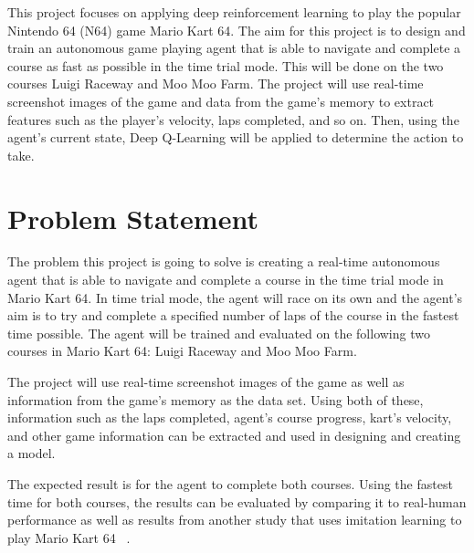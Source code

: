 \documentclass[10pt,twocolumn,letterpaper]{article}
\begin{document}
This project focuses on applying deep reinforcement learning to play the popular Nintendo 64 (N64) game Mario Kart 64. The aim for this project is to design and train an autonomous game playing agent that is able to navigate and complete a course as fast as possible in the time trial mode. This will be done on the two courses Luigi Raceway and Moo Moo Farm. The project will use real-time screenshot images of the game and data from the game's memory to extract features such as the player's velocity, laps completed, and so on. Then, using the agent's current state, Deep Q-Learning will be applied to determine the action to take.





\section{Problem Statement}
\label{sec:formatting}

The problem this project is going to solve is creating a real-time autonomous agent that is able to navigate and complete a course in the time trial mode in Mario Kart 64. In time trial mode, the agent will race on its own and the agent's aim is to try and complete a specified number of laps of the course in the fastest time possible. The agent will be trained and evaluated on the following two courses in Mario Kart 64: Luigi Raceway and Moo Moo Farm.

The project will use real-time screenshot images of the game as well as information from the game's memory as the data set. Using both of these, information such as the laps completed, agent's course progress, kart's velocity, and other game information can be extracted and used in designing and creating a model.

The expected result is for the agent to complete both courses. Using the fastest time for both courses, the results can be evaluated by comparing it to real-human performance as well as results from another study that uses imitation learning to play Mario Kart 64 ~\cite{ho2017neuralkart}.

\end{document}
